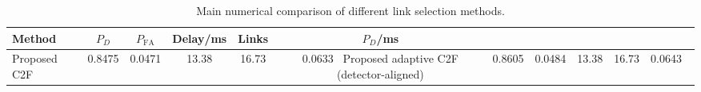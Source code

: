 \begin{table}[t]
    \centering
    \caption{Main numerical comparison of different link selection methods.}
    \label{tab:main_summary}
    \begin{tabular}{l c c c c c}
        \hline
        Method & $P_D$ & $P_{\mathrm{FA}}$ & Delay/ms & Links & $P_D$/ms \\
        \hline
        Proposed C2F & 0.8475 & 0.0471 & 13.38 & 16.73 & 0.0633 \
        Proposed adaptive C2F (detector-aligned) & 0.8605 & 0.0484 & 13.38 & 16.73 & 0.0643 \
        \hline
    \end{tabular}
\end{table}
